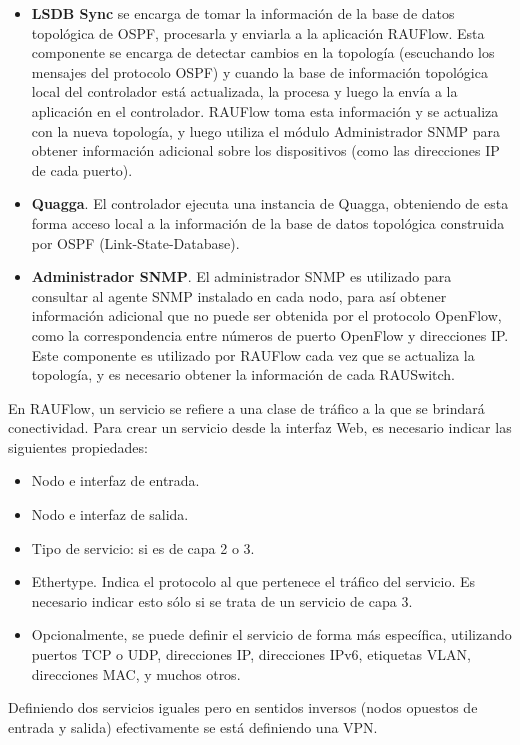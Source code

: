\begin{itemize}
\begin{itemize}
			\item \textbf{LSDB Sync} se encarga de tomar la información de la base de datos topológica de OSPF, procesarla y enviarla a la aplicación RAUFlow.
			Esta componente se encarga de detectar cambios en la topología (escuchando los mensajes del protocolo OSPF) y cuando la base de información topológica local del controlador está actualizada, la procesa y luego la envía a la aplicación en el controlador. RAUFlow toma esta información y se actualiza con la nueva topología, y luego utiliza el módulo Administrador SNMP para obtener información adicional sobre los dispositivos (como las direcciones IP de cada puerto).
			\item \textbf{Quagga}. El controlador ejecuta una instancia de Quagga, obteniendo de esta forma acceso local a la información de la base de datos topológica construida por OSPF (Link-State-Database).
			\item \textbf{Administrador SNMP}. El administrador SNMP es utilizado para consultar al agente SNMP instalado en cada nodo, para así obtener información adicional que no puede ser obtenida por el protocolo OpenFlow, como la correspondencia entre números de puerto OpenFlow y direcciones IP. Este componente es utilizado por RAUFlow cada vez que se actualiza la topología, y es necesario obtener la información de cada RAUSwitch.
		\end{itemize}
\end{itemize}

En RAUFlow, un servicio se refiere a una clase de tráfico a la que se brindará conectividad. Para crear un servicio desde la interfaz Web, es necesario indicar las siguientes propiedades:
\begin{itemize}
	\item Nodo e interfaz de entrada.
	\item Nodo e interfaz de salida.
	\item Tipo de servicio: si es de capa 2 o 3.
	\item Ethertype. Indica el protocolo al que pertenece el tráfico del servicio. Es necesario indicar esto sólo si se trata de un servicio de capa 3.
	\item Opcionalmente, se puede definir el servicio de forma más específica, utilizando puertos TCP o UDP, direcciones IP, direcciones IPv6, etiquetas VLAN, direcciones MAC, y muchos otros.
\end{itemize}

Definiendo dos servicios iguales pero en sentidos inversos (nodos opuestos de entrada y salida) efectivamente se está definiendo una VPN.

